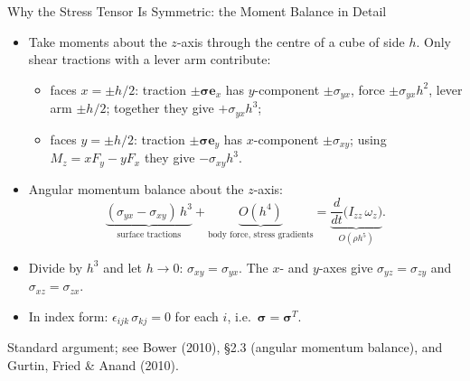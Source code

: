 \documentclass[aspectratio=169,11pt]{beamer}
\begin{document}
\begin{frame}{Why the Stress Tensor Is Symmetric: the Moment Balance in Detail}
\begin{itemize}
  \item Take moments about the $z$-axis through the centre of a cube of side $h$. Only shear tractions with a lever arm contribute:
  \begin{itemize}
    \item faces $x=\pm h/2$: traction $\pm\boldsymbol{\sigma}\mathbf{e}_x$ has $y$-component $\pm\sigma_{yx}$, force $\pm\sigma_{yx}h^2$, lever arm $\pm h/2$; together they give $+\sigma_{yx}h^3$;
    \item faces $y=\pm h/2$: traction $\pm\boldsymbol{\sigma}\mathbf{e}_y$ has $x$-component $\pm\sigma_{xy}$; using $M_z = xF_y - yF_x$ they give $-\sigma_{xy}h^3$.
  \end{itemize}
  \item Angular momentum balance about the $z$-axis:
  \[
    \underbrace{(\sigma_{yx}-\sigma_{xy})\,h^3}_{\text{surface tractions}} + \underbrace{O(h^4)}_{\text{body force, stress gradients}}
    = \underbrace{\frac{d}{dt}\big(I_{zz}\,\omega_z\big)}_{O(\rho h^5)} .
  \]
  \item Divide by $h^3$ and let $h\to 0$: $\sigma_{xy}=\sigma_{yx}$. The $x$- and $y$-axes give $\sigma_{yz}=\sigma_{zy}$ and $\sigma_{xz}=\sigma_{zx}$.
  \item In index form: $\epsilon_{ijk}\,\sigma_{kj} = 0$ for each $i$, i.e.\ $\boldsymbol{\sigma}=\boldsymbol{\sigma}^T$.
\end{itemize}
\vspace{1mm}
{\tiny\color{DarkGray}Standard argument; see Bower (2010), \S2.3 (angular momentum balance), and Gurtin, Fried \& Anand (2010).\par}
\end{frame}
\end{document}
